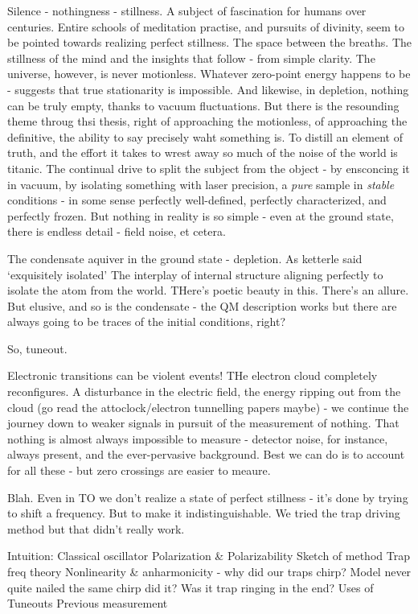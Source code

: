 Silence - nothingness - stillness. A subject of fascination for humans
over centuries. Entire schools of meditation practise, and pursuits of
divinity, seem to be pointed towards realizing perfect stillness. The
space between the breaths. The stillness of the mind and the insights
that follow - from simple clarity. The universe, however, is never
motionless. Whatever zero-point energy happens to be - suggests that
true stationarity is impossible. And likewise, in depletion, nothing can
be truly empty, thanks to vacuum fluctuations. But there is the
resounding theme throug thsi thesis, right of approaching the
motionless, of approaching the definitive, the ability to say precisely
waht something is. To distill an element of truth, and the effort it
takes to wrest away so much of the noise of the world is titanic. The
continual drive to split the subject from the object - by ensconcing it
in vacuum, by isolating something with laser precision, a \emph{pure}
sample in \emph{stable} conditions - in some sense perfectly
well-defined, perfectly characterized, and perfectly frozen. But nothing
in reality is so simple - even at the ground state, there is endless
detail - field noise, et cetera.

The condensate aquiver in the ground state - depletion. As ketterle said
`exquisitely isolated' The interplay of internal structure aligning
perfectly to isolate the atom from the world. THere's poetic beauty in
this. There's an allure. But elusive, and so is the condensate - the QM
description works but there are always going to be traces of the initial
conditions, right?

So, tuneout.

Electronic transitions can be violent events! THe electron cloud
completely reconfigures. A disturbance in the electric field, the energy
ripping out from the cloud (go read the attoclock/electron tunnelling
papers maybe) - we continue the journey down to weaker signals in
pursuit of the measurement of nothing. That nothing is almost always
impossible to measure - detector noise, for instance, always present,
and the ever-pervasive background. Best we can do is to account for all
these - but zero crossings are easier to meaure.

Blah. Even in TO we don't realize a state of perfect stillness - it's
done by trying to shift a frequency. But to make it indistinguishable.
We tried the trap driving method but that didn't really work.




Intuition: Classical oscillator
Polarization \& Polarizability 
Sketch of method
Trap freq theory
Nonlinearity \& anharmonicity - why did our traps chirp? Model never quite nailed the same chirp did it? Was it trap ringing in the end?
Uses of Tuneouts
Previous measurement


